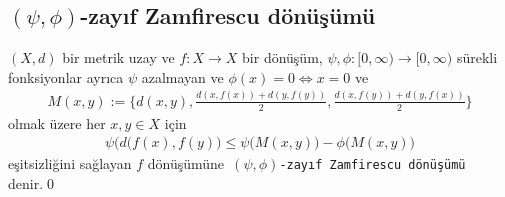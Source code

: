 \documentclass[8pt]{beamer}
\begin{document}
\subsection{$(\psi,\phi)$-zay\i f Zamfirescu d\"{o}n\"{u}\c{s}\"{u}m\"{u}}
\begin{frame}
  \begin{definition}
    $(X,d)$  bir metrik uzay ve $f: X \rightarrow X$ bir d\"{o}n\"{u}\c{s}\"{u}m, $\psi,\phi : [0,\infty)\to [0,\infty)$ s\"urekli fonksiyonlar ayr\i ca $\psi$ azalmayan ve $\phi(x)=0 \iff x=0$ ve
    \begin{align}
M(x,y):=\bigg\{ d(x,y), \frac{d(x,f(x))+d(y,f(y))}{2}, \frac{d(x,f(y))+d(y,f(x))}{2} \bigg\}
    \end{align}
olmak \"{u}zere her $x,y \in X$ i\c{c}in
\begin{align}
\psi\big(d(f(x),f(y)\big)\leq \psi\big(M(x,y)\big)-\phi\big(M(x,y)\big)
\end{align}
e\c{s}itsizli\u{g}ini sa\u{g}layan $f$ d\"{o}n\"{u}\c{s}\"{u}m\"une\texttt{ $(\psi,\phi)$-zay\i f Zamfirescu d\"{o}n\"{u}\c{s}\"{u}m\"{u}} denir.\qed 
  \end{definition}
\end{frame}%
\end{document}

